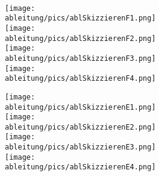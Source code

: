 \begin{Exercise}[title={\raggedright Skizziere jeweils die Ableitungsfunktion.}, label=ableitungSkizzierenA1]\\
	\begin{minipage}{\textwidth}
		\begin{minipage}[][][c]{0.49\textwidth}
			\centering\texttt{[image: \\ableitung/pics/ablSkizzierenF1.png]}\vspace{0.1cm}\\
			\centering\texttt{[image: \\ableitung/pics/ablSkizzierenF2.png]}\vspace{0.1cm}\\
			\centering\texttt{[image: \\ableitung/pics/ablSkizzierenF3.png]}\vspace{0.1cm}\\
			\centering\texttt{[image: \\ableitung/pics/ablSkizzierenF4.png]}
		\end{minipage}
		\begin{minipage}[][][c]{0.49\textwidth}
			\centering\texttt{[image: \\ableitung/pics/ablSkizzierenE1.png]}\vspace{0.1cm}\\
			\centering\texttt{[image: \\ableitung/pics/ablSkizzierenE2.png]}\vspace{0.1cm}\\
			\centering\texttt{[image: \\ableitung/pics/ablSkizzierenE3.png]}\vspace{0.1cm}\\
			\centering\texttt{[image: \\ableitung/pics/ablSkizzierenE4.png]}
		\end{minipage}
	\end{minipage}
\end{Exercise}
